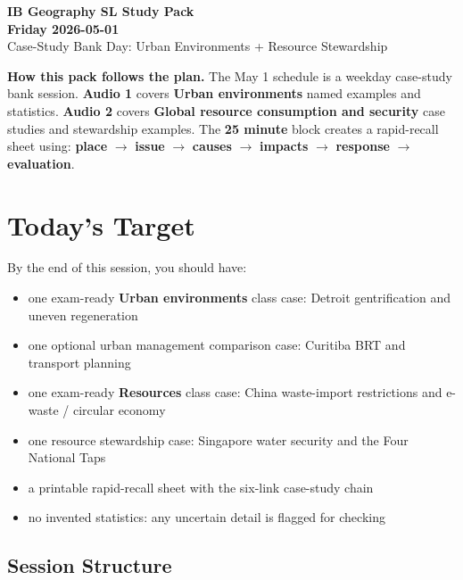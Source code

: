 \documentclass[11pt,a4paper]{article}
\newcommand{\term}[1]{\textcolor{HeadingBlue}{\textbf{#1}}}
\newcommand{\boxnote}[3]{%
\noindent\colorbox{#1}{%
  \begin{minipage}{0.965\textwidth}
  \sffamily
  \textbf{\textcolor{HeadingBlue}{#2}} #3
  \end{minipage}
}}
\begin{document}
\begin{center}
  {\sffamily\bfseries\color{HeadingBlue}\LARGE IB Geography SL Study Pack}\\[0.25em]
  {\sffamily\bfseries\color{AccentTeal}\Large Friday 2026-05-01}\\[0.35em]
  {\sffamily\color{TextInk}Case-Study Bank Day: Urban Environments + Resource Stewardship}
\end{center}

\vspace{0.4em}

\boxnote{SoftBlue}{How this pack follows the plan.}{The May 1 schedule is a
weekday case-study bank session. \term{Audio 1} covers \term{Urban
environments} named examples and statistics. \term{Audio 2} covers
\term{Global resource consumption and security} case studies and stewardship
examples. The \term{25 minute} block creates a rapid-recall sheet using:
\term{place} $\rightarrow$ \term{issue} $\rightarrow$ \term{causes}
$\rightarrow$ \term{impacts} $\rightarrow$ \term{response} $\rightarrow$
\term{evaluation}.}

\section{Today's Target}

By the end of this session, you should have:

\begin{itemize}
  \item one exam-ready \term{Urban environments} class case: Detroit
  gentrification and uneven regeneration
  \item one optional urban management comparison case: Curitiba BRT and
  transport planning
  \item one exam-ready \term{Resources} class case: China waste-import
  restrictions and e-waste / circular economy
  \item one resource stewardship case: Singapore water security and the Four
  National Taps
  \item a printable rapid-recall sheet with the six-link case-study chain
  \item no invented statistics: any uncertain detail is flagged for checking
\end{itemize}

\subsection{Session Structure}
\end{document}
